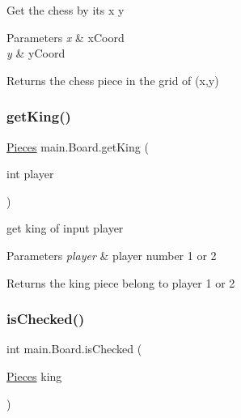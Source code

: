 Get the chess by its x y 
\begin{DoxyParams}{Parameters}
{\em x} & x\+Coord \\
\hline
{\em y} & y\+Coord \\
\hline
\end{DoxyParams}
\begin{DoxyReturn}{Returns}
the chess piece in the grid of (x,y) 
\end{DoxyReturn}
\mbox{\label{classmain_1_1_board_a46026803c3c65d8e3cbadc70938f2f90}} 
\subsubsection{\texorpdfstring{get\+King()}{getKing()}}
{\footnotesize\ttfamily \mbox{\hyperlink{classmain_1_1_pieces}{Pieces}} main.\+Board.\+get\+King (\begin{DoxyParamCaption}\item[{int}]{player }\end{DoxyParamCaption})\hspace{0.3cm}{\ttfamily [inline]}}

get king of input player 
\begin{DoxyParams}{Parameters}
{\em player} & player number 1 or 2 \\
\hline
\end{DoxyParams}
\begin{DoxyReturn}{Returns}
the king piece belong to player 1 or 2 
\end{DoxyReturn}
\mbox{\label{classmain_1_1_board_a873fc556e24347e49daad1e98a4bebee}} 
\subsubsection{\texorpdfstring{is\+Checked()}{isChecked()}}
{\footnotesize\ttfamily int main.\+Board.\+is\+Checked (\begin{DoxyParamCaption}\item[{\mbox{\hyperlink{classmain_1_1_pieces}{Pieces}}}]{king }\end{DoxyParamCaption})\hspace{0.3cm}{\ttfamily [inline]}}


